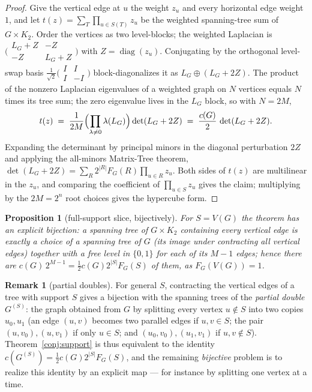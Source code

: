 \documentclass[11pt]{amsart}
\newtheorem{proposition}[theorem]{Proposition}
\theoremstyle{definition}
\newtheorem{remark}[theorem]{Remark}
\begin{document}
\begin{proof}
Give the vertical edge at $u$ the weight $z_u$ and every horizontal edge
weight $1$, and let $t(z) = \sum_T \prod_{u \in S(T)} z_u$ be the weighted
spanning-tree sum of $G\times K_2$. Order the vertices as two level-blocks;
the weighted Laplacian is
$\bigl(\begin{smallmatrix} L_G + Z & -Z \\ -Z & L_G + Z\end{smallmatrix}\bigr)$
with $Z = \operatorname{diag}(z_u)$. Conjugating by the orthogonal
level-swap basis $\frac{1}{\sqrt 2}\bigl(\begin{smallmatrix} I & I \\ I &
-I \end{smallmatrix}\bigr)$ block-diagonalizes it as $L_G \oplus (L_G+2Z)$.
The product of the nonzero Laplacian eigenvalues of a weighted graph on $N$
vertices equals $N$ times its tree sum; the zero eigenvalue lives in the
$L_G$ block, so with $N = 2M$,
\[
  t(z) \;=\; \frac{1}{2M}\Bigl(\prod_{\lambda \neq 0}\lambda(L_G)\Bigr)
             \det(L_G + 2Z)
        \;=\; \frac{c(G)}{2}\,\det(L_G + 2Z).
\]
Expanding the determinant by principal minors in the diagonal perturbation
$2Z$ and applying the all-minors Matrix-Tree theorem,
$\det(L_G+2Z) = \sum_{R} 2^{|R|} F_G(R) \prod_{u\in R} z_u$. Both sides of
$t(z)$ are multilinear in the $z_u$, and comparing the coefficient of
$\prod_{u\in S} z_u$ gives the claim; multiplying by the $2M = 2^n$ root
choices gives the hypercube form.
\end{proof}

\begin{proposition}[full-support slice, bijectively]\label{prop:fullsupport}
For $S = V(G)$ the theorem has an explicit bijection: a spanning tree of
$G\times K_2$ containing every vertical edge is exactly a choice of a
spanning tree of $G$ (its image under contracting all vertical edges)
together with a free level in $\{0,1\}$ for each of its $M-1$ edges; hence
there are $c(G)\,2^{M-1} = \tfrac12 c(G) 2^{|S|} F_G(S)$ of them, as
$F_G(V(G))=1$.
\end{proposition}

\begin{remark}[partial doubles]\label{rem:partialdouble}
For general $S$, contracting the vertical edges of a tree with support $S$
gives a bijection with the spanning trees of the \emph{partial double}
$G^{(S)}$: the graph obtained from $G$ by splitting every vertex $u \notin
S$ into two copies $u_0, u_1$ (an edge $(u,v)$ becomes two parallel edges if
$u,v\in S$; the pair $(u,v_0),(u,v_1)$ if only $u \in S$; and
$(u_0,v_0),(u_1,v_1)$ if $u,v\notin S$). Theorem~\ref{conj:support} is thus
equivalent to the identity $c(G^{(S)}) = \tfrac12 c(G) 2^{|S|} F_G(S)$, and
the remaining \emph{bijective} problem is to realize this identity by an
explicit map --- for instance by splitting one vertex at a time.
\end{remark}
\end{document}
